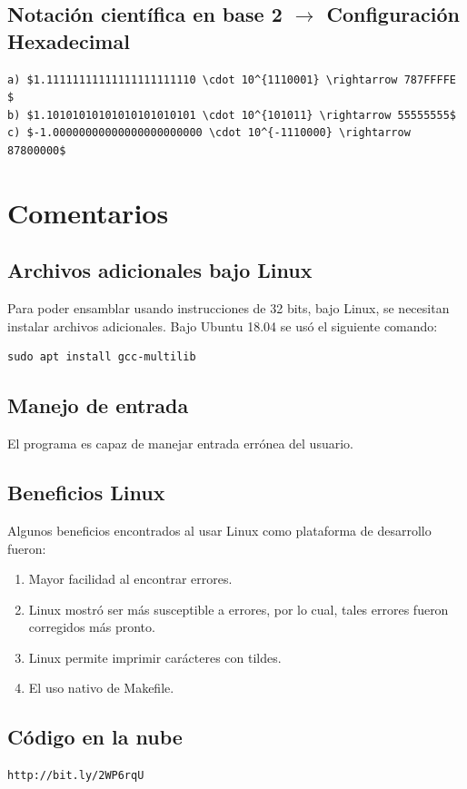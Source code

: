 \documentclass{article}
\begin{document}
\subsection{Notación científica en base 2 $\rightarrow$ Configuración Hexadecimal}
\begin{lstlisting}[mathescape]
a) $1.11111111111111111111110 \cdot 10^{1110001} \rightarrow 787FFFFE   $
b) $1.10101010101010101010101 \cdot 10^{101011} \rightarrow 55555555$
c) $-1.00000000000000000000000 \cdot 10^{-1110000} \rightarrow 87800000$
\end{lstlisting}

\newpage
\section{Comentarios}
\subsection{Archivos adicionales bajo Linux}
Para poder ensamblar usando instrucciones de 32 bits, bajo Linux, se necesitan instalar archivos adicionales. Bajo Ubuntu 18.04 se usó el siguiente comando:
\begin{verbatim}
sudo apt install gcc-multilib
\end{verbatim}
\subsection{Manejo de entrada}
El programa es capaz de manejar entrada errónea del usuario.
\subsection{Beneficios Linux}
Algunos beneficios encontrados al usar Linux como plataforma de desarrollo fueron:
\begin{enumerate}
\item Mayor facilidad al encontrar errores.
\item Linux mostró ser más susceptible a errores, por lo cual, tales errores fueron corregidos más pronto.
\item Linux permite imprimir carácteres con tildes.
\item El uso nativo de Makefile.
\end{enumerate}
\subsection{Código en la nube}
\begin{verbatim}
http://bit.ly/2WP6rqU
\end{verbatim}
\end{document}
